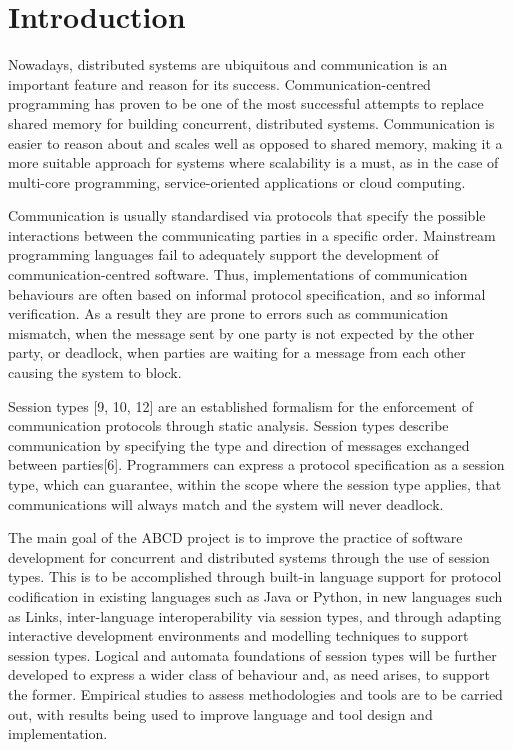 \section{Introduction}


Nowadays, distributed systems are ubiquitous and communication is an important feature and reason for its success. Communication-centred programming has proven to be one of the most successful attempts to replace shared memory for building concurrent, distributed systems. Communication is easier to reason about and scales well as opposed to shared memory, making it a more suitable approach for systems where scalability is a must, as in the case of multi-core programming, service-oriented applications or cloud computing\cite{abcd}.

Communication is usually standardised via protocols that specify the possible interactions between the communicating parties in a specific order. Mainstream programming languages fail to adequately support the development of communication-centred software. Thus, implementations of communication behaviours are often based on informal protocol specification, and so informal verification. As a result they are prone to errors such as communication mismatch, when the message sent by one party is not expected by the other party, or deadlock, when parties are waiting for a message from each other causing the system to block\cite{abcd}.


Session types [9, 10, 12] are an established formalism for the enforcement of communication protocols through static analysis. Session types describe communication by specifying the type and direction of messages exchanged between parties[6]. Programmers can express a protocol specification as a session type, which can guarantee, within the scope where the session type applies, that communications will always match and the system will never deadlock.

The main goal of the ABCD project\cite{abcd} is to improve the practice of software development for concurrent and distributed systems through the use of session types. This is to be accomplished through built-in language support for protocol codification in existing languages such as Java or Python, in new languages such as Links\cite{links}, inter-language interoperability via session types, and through adapting interactive development environments and modelling techniques to support session types. Logical and automata foundations of session types will be further developed to express a wider class of behaviour and, as need arises, to support the former. Empirical studies to assess methodologies and tools are to be carried out, with results being used to improve language and tool design and implementation.



